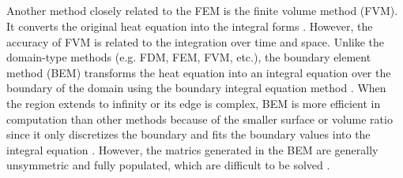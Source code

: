 \subsection{}


Another method closely related to the FEM is the finite volume method
(FVM). It converts the original heat equation into the integral forms
\cite{eymard2000finite}. However, the accuracy of FVM is related to
the integration over time and space. Unlike the domain-type methods
(e.g. FDM, FEM, FVM, etc.), the boundary element method (BEM)
transforms the heat equation into an integral equation over the
boundary of the domain using the boundary integral equation method
\cite{attaway1991boundary}. When the region extends to infinity or its
edge is complex, BEM is more efficient in computation than other
methods because of the smaller surface or volume ratio
\cite{katsikadelis2002boundary} since it only discretizes the boundary
and fits the boundary values into the integral equation
\cite{ang2007beginner}. However, the matrics generated in the BEM are
generally unsymmetric and fully populated, which are difficult to be
solved \cite{mushtaq2010advantages}.


